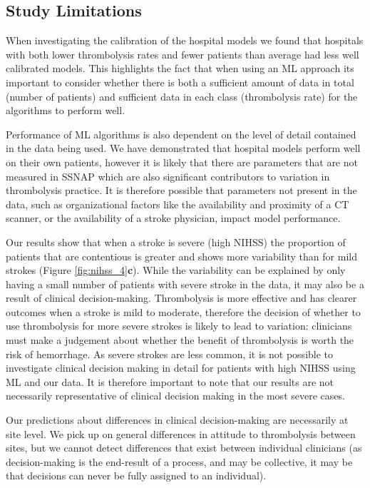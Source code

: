 \documentclass[12pt,a4paper, pdftex]{elsarticle}
\begin{document}
\subsection{Study Limitations}

When investigating the calibration of the hospital models we found that hospitals with both lower thrombolysis rates and fewer patients than average had less well calibrated models. This highlights the fact that when using an ML approach its important to consider whether there is both a sufficient amount of data in total (number of patients) and sufficient data in each class (thrombolysis rate) for the algorithms to perform well. 

Performance of ML algorithms is also dependent on the level of detail contained in the data being used. We have demonstrated that hospital models perform well on their own patients, however it is likely that there are parameters that are not measured in SSNAP which are also significant contributors to variation in thrombolysis practice. It is therefore possible that parameters not present in the data, such as organizational factors like the availability and proximity of a CT scanner, or the availability of a stroke physician, impact model performance.

Our results show that when a stroke is severe (high NIHSS) the proportion of patients that are contentious is greater and shows more variability than for mild strokes (Figure \ref{fig:nihss_4}{\bf c}). While the variability can be explained by only having a small number of patients with severe stroke in the data, it may also be a result of clinical decision-making. Thrombolysis is more effective and has clearer outcomes when a stroke is mild to moderate, therefore the decision of whether to use thrombolysis for more severe strokes is likely to lead to variation: clinicians must make a judgement about whether the benefit of thrombolysis is worth the risk of hemorrhage. As severe strokes are less common, it is not possible to investigate clinical decision making in detail for patients with high NIHSS using ML and our data. It is therefore important to note that our results are not necessarily representative of clinical decision making in the most severe cases.

Our predictions about differences in clinical decision-making are necessarily at site level. We pick up on general differences in attitude to thrombolysis between sites, but we cannot detect differences that exist between individual clinicians (as decision-making is the end-result of a process, and may be collective, it may be that decisions can never be fully assigned to an individual).
\end{document}
